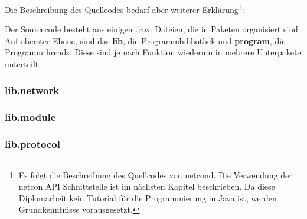 \documentclass[a4paper,14pt,headsepline]{scrartcl}
\begin{document}
\begin{figure}[h]
\begin{center}
\end{center}
\end{figure}

\newpage

Die Beschreibung des Quellcodes bedarf aber weiterer Erklärung\footnote{Es folgt die Beschreibung des Quellcodes von netcond. Die Verwendung der netcon API Schnittstelle ist im nächsten Kapitel beschrieben. Da diese Diplomarbeit kein Tutorial für die Programmierung in Java ist, werden Grundkenntnisse vorausgesetzt.}: 

Der Sourcecode besteht aus einigen .java Dateien, die in Paketen organisiert sind. Auf oberster Ebene, sind das \textbf{lib}, die Programmbibliothek und \textbf{program}, die Programmthreads. Diese sind je nach Funktion wiederum in mehrere Unterpakete unterteilt.

\subsubsection*{lib.network}
\subsubsection*{lib.module}
\subsubsection*{lib.protocol}
\end{document}
